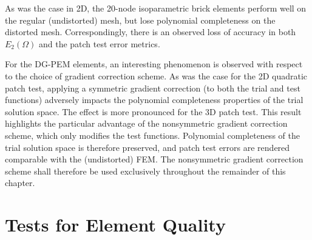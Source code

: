 As was the case in 2D, the 20-node isoparametric brick elements perform well on the regular (undistorted) mesh, but lose polynomial completeness on the distorted mesh. Correspondingly, there is an observed loss of accuracy in both $E_2 (\Omega)$ and the patch test error metrics.

For the DG-PEM elements, an interesting phenomenon is observed with respect to the choice of gradient correction scheme. As was the case for the 2D quadratic patch test, applying a symmetric gradient correction (to both the trial and test functions) adversely impacts the polynomial completeness properties of the trial solution space. The effect is more pronounced for the 3D patch test. This result highlights the particular advantage of the nonsymmetric gradient correction scheme, which only modifies the test functions. Polynomial completeness of the trial solution space is therefore preserved, and patch test errors are rendered comparable with the (undistorted) FEM. The nonsymmetric gradient correction scheme shall therefore be used exclusively throughout the remainder of this chapter.


\section{Tests for Element Quality}

